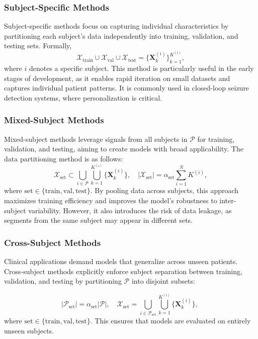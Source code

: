 \subsubsection{Subject-Specific Methods}
Subject-specific methods focus on capturing individual characteristics by partitioning each subject’s data independently into training, validation, and testing sets. Formally,
\[
\mathcal{X}_\text{train} \cup \mathcal{X}_\text{val} \cup \mathcal{X}_\text{test} = \{\mathbf{X}_k^{(i)}\}_{k=1}^{K^{(i)}},
\]
where \(i\) denotes a specific subject. This method is particularly useful in the early stages of development, as it enables rapid iteration on small datasets and captures individual patient patterns. It is commonly used in closed-loop seizure detection systems, where personalization is critical.

\subsubsection{Mixed-Subject Methods}
Mixed-subject methods leverage signals from all subjects in \(\mathcal{P}\) for training, validation, and testing, aiming to create models with broad applicability. 
The data partitioning method is as follows:
\[
\mathcal{X}_\text{set} \subset \bigcup_{i \in \mathcal{P}} \bigcup_{k=1}^{K^{(i)}} \{\mathbf{X}^{(i)}_k\}, \quad
|\mathcal{X}_\text{set}| = \alpha_\text{set} \sum_{i=1}^{N} K^{(i)},
\]
where \(\text{set} \in \{\text{train}, \text{val}, \text{test}\}\).
By pooling data across subjects, this approach maximizes training efficiency and improves the model’s robustness to inter-subject variability. However, it also introduces the risk of data leakage, as segments from the same subject may appear in different sets.

\subsubsection{Cross-Subject Methods}
Clinical applications demand models that generalize across unseen patients. Cross-subject methods explicitly enforce subject separation between training, validation, and testing by partitioning $\mathcal{P}$ into disjoint subsets:

\[
|\mathcal{P}_\text{set}| = \alpha_\text{set} |\mathcal{P}|, \quad
\mathcal{X}_\text{set} = \bigcup_{i \in \mathcal{P}_\text{set}} \bigcup_{k=1}^{K^{(i)}} \{\mathbf{X}^{(i)}_k\},\
\]
where \(\text{set} \in \{\text{train}, \text{val}, \text{test}\}\).
This ensures that models are evaluated on entirely unseen subjects. 

